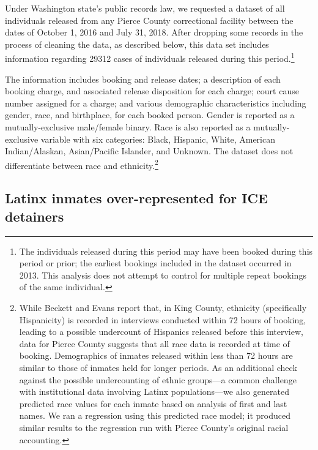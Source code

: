 \documentclass[12pt]{report}\usepackage[]{graphicx}\usepackage[]{color}
\begin{document}
Under Washington state's public records law, we requested a dataset of all individuals released from any Pierce County correctional facility between the dates of October 1, 2016 and July 31, 2018. After dropping some records in the process of cleaning the data, as described below, this data set includes information regarding 29312 cases of individuals released during this period.\footnote{The individuals released during this period may have been booked during this period or prior; the earliest bookings included in the dataset occurred in 2013. This analysis does not attempt to control for multiple repeat bookings of the same individual.}

The information includes booking and release dates; a description of each booking charge, and associated release disposition for each charge; court cause number assigned for a charge; and various demographic characteristics including gender, race, and birthplace, for each booked person. Gender is reported as a mutually-exclusive male/female binary. Race is also reported as a mutually-exclusive variable with six categories: Black, Hispanic, White, American Indian/Alaskan, Asian/Pacific Islander, and Unknown. The dataset does not differentiate between race and ethnicity.\footnote{While Beckett and Evans report that, in King County, ethnicity (specifically Hispanicity) is recorded in interviews conducted within 72 hours of booking, leading to a possible undercount of Hispanics released before this interview, data for Pierce County suggests that all race data is recorded at time of booking. Demographics of inmates released within less than 72 hours are similar to those of inmates held for longer periods. As an additional check against the possible undercounting of ethnic groups---a common challenge with institutional data involving Latinx populations---we also generated predicted race values for each inmate based on analysis of first and last names. We ran a regression using this predicted race model; it produced similar results to the regression run with Pierce County's original racial accounting.}

\subsection*{Latinx inmates over-represented for ICE detainers}
\end{document}
